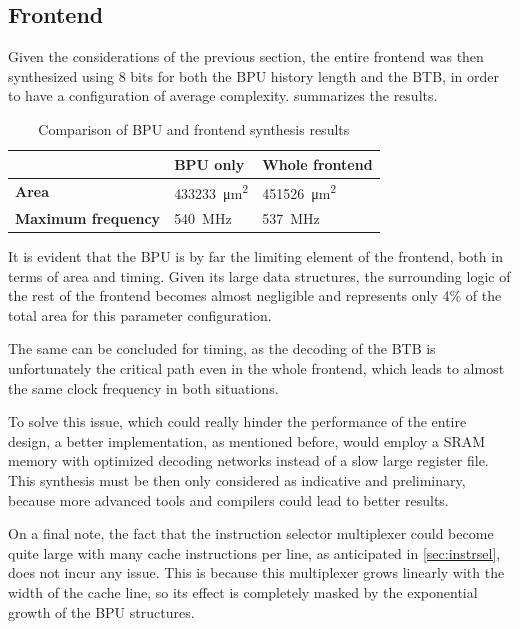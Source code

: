 \pagebreak
\subsection{Frontend}
Given the considerations of the previous section, the entire frontend was then synthesized using 8 bits for both the \ac{BPU} history length and the \ac{BTB}, in order to have a configuration of average complexity.  summarizes the results.

\begin{table}[hbt]
  \centering
  \begin{tabular}{lll}
    \toprule
                                & \textbf{BPU only}           & \textbf{Whole frontend}     \\ \midrule
    \textbf{Area}               & \SI{433233}{\micro\meter^2} & \SI{451526}{\micro\meter^2} \\ \midrule
    \textbf{Maximum frequency}  & \SI{540}{MHz}               & \SI{537}{MHz}               \\
    \bottomrule
  \end{tabular}
  \caption{Comparison of BPU and frontend synthesis results}
  \label{tab:frontend}
\end{table}

It is evident that the \ac{BPU} is by far the limiting element of the frontend, both in terms of area and timing. Given its large data structures, the surrounding logic of the rest of the frontend becomes almost negligible and represents only 4\% of the total area for this parameter configuration.

The same can be concluded for timing, as the decoding of the \ac{BTB} is unfortunately the critical path even in the whole frontend, which leads to almost the same clock frequency in both situations.

\pagebreak
To solve this issue, which could really hinder the performance of the entire design, a better implementation, as mentioned before, would employ a SRAM memory with optimized decoding networks instead of a slow large register file. This synthesis must be then only considered as indicative and preliminary, because more advanced tools and compilers could lead to better results.

On a final note, the fact that the instruction selector multiplexer could become quite large with many cache instructions per line, as anticipated in \cref{sec:instrsel}, does not incur any issue. This is because this multiplexer grows linearly with the width of the cache line, so its effect is completely masked by the exponential growth of the \ac{BPU} structures.
